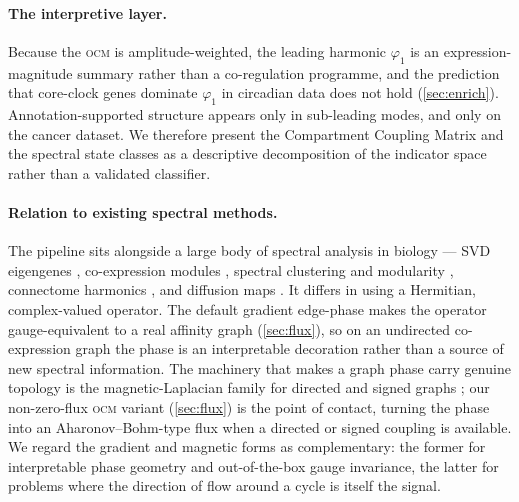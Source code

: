 \documentclass[preprint,12pt,amsmath,amssymb,superscriptaddress,floatfix]{revtex4-2}
\theoremstyle{definition}
\theoremstyle{plain}
\newcommand{\OCM}{\textsc{ocm}}
\begin{document}
\paragraph{The interpretive layer.}
Because the \OCM{} is amplitude-weighted, the leading harmonic $\varphi_1$ is an
expression-magnitude summary rather than a co-regulation programme, and the
prediction that core-clock genes dominate $\varphi_1$ in circadian data does not
hold (\cref{sec:enrich}). Annotation-supported structure appears only in
sub-leading modes, and only on the cancer dataset. We therefore present the
Compartment Coupling Matrix and the spectral state classes as a descriptive
decomposition of the indicator space rather than a validated classifier.

\paragraph{Relation to existing spectral methods.}
The pipeline sits alongside a large body of spectral analysis in biology --- SVD
eigengenes \citep{alter2000svd}, co-expression modules
\citep{langfelder2008wgcna}, spectral clustering and modularity
\citep{vonluxburg2007tutorial, newman2006modularity}, connectome harmonics
\citep{atasoy2016connectome}, and diffusion maps \citep{haghverdi2015diffusion}.
It differs in using a Hermitian, complex-valued operator. The default gradient
edge-phase makes the operator gauge-equivalent to a real affinity graph
(\cref{sec:flux}), so on an undirected co-expression graph the phase is an
interpretable decoration rather than a source of new spectral information. The
machinery that makes a graph phase carry genuine
topology is the magnetic-Laplacian family for directed and signed graphs
\citep{guo2017hermitian, zhang2021magnet, he2022msgnn, furutani2019graph,
fanuel2017magnetic, fanuel2018magnetic, bottcher2024complex}; our non-zero-flux
\OCM{} variant (\cref{sec:flux}) is the point of contact, turning the phase into
an Aharonov--Bohm-type flux when a directed or signed coupling is available. We
regard the gradient and magnetic forms as complementary: the former for
interpretable phase geometry and out-of-the-box gauge invariance, the latter for
problems where the direction of flow around a cycle is itself the signal.
\end{document}
